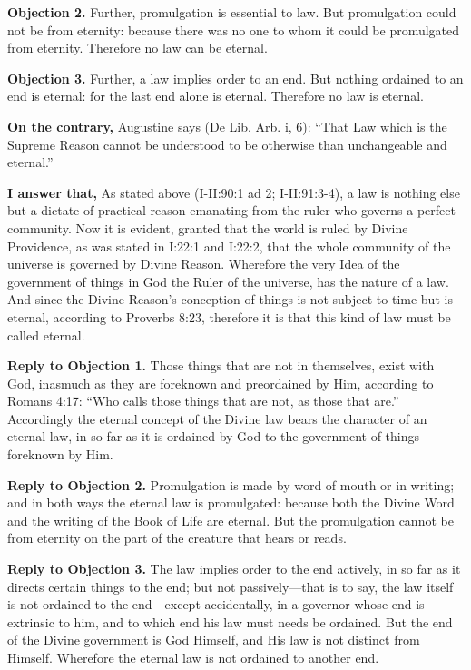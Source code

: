 \textbf{Objection 2.} Further, promulgation is essential to law. But promulgation could not be from eternity: because there was no one to whom it could be promulgated from eternity. Therefore no law can be eternal.

\textbf{Objection 3.} Further, a law implies order to an end. But nothing ordained to an end is eternal: for the last end alone is eternal. Therefore no law is eternal.

\textbf{On the contrary,} Augustine says (De Lib. Arb. i, 6): ``That Law which is the Supreme Reason cannot be understood to be otherwise than unchangeable and eternal.''

\textbf{I answer that,} As stated above (I-II:90:1 ad 2; I-II:91:3-4), a law is nothing else but a dictate of practical reason emanating from the ruler who governs a perfect community. Now it is evident, granted that the world is ruled by Divine Providence, as was stated in I:22:1 and I:22:2, that the whole community of the universe is governed by Divine Reason. Wherefore the very Idea of the government of things in God the Ruler of the universe, has the nature of a law. And since the Divine Reason's conception of things is not subject to time but is eternal, according to Proverbs 8:23, therefore it is that this kind of law must be called eternal.

\textbf{Reply to Objection 1.} Those things that are not in themselves, exist with God, inasmuch as they are foreknown and preordained by Him, according to Romans 4:17: ``Who calls those things that are not, as those that are.'' Accordingly the eternal concept of the Divine law bears the character of an eternal law, in so far as it is ordained by God to the government of things foreknown by Him.

\textbf{Reply to Objection 2.} Promulgation is made by word of mouth or in writing; and in both ways the eternal law is promulgated: because both the Divine Word and the writing of the Book of Life are eternal. But the promulgation cannot be from eternity on the part of the creature that hears or reads.

\textbf{Reply to Objection 3.} The law implies order to the end actively, in so far as it directs certain things to the end; but not passively—that is to say, the law itself is not ordained to the end—except accidentally, in a governor whose end is extrinsic to him, and to which end his law must needs be ordained. But the end of the Divine government is God Himself, and His law is not distinct from Himself. Wherefore the eternal law is not ordained to another end.

